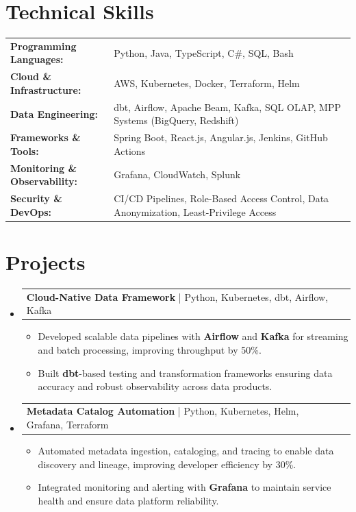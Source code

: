 \documentclass[letterpaper,10pt]{article}
\makeatletter
\newcommand{\resumeItem}[1]{
  \item{\fontsize{8pt}{9pt}\selectfont
    #1 \vspace{-3pt}
  }
}
\newcommand{\resumeProjectHeading}[2]{
    \item
    \begin{tabular*}{1.001\textwidth}{l@{\extracolsep{\fill}}r}
      \fontsize{8.5pt}{10pt}#1 & \textbf{\fontsize{8.5pt}{10pt} #2}\\
    \end{tabular*}\vspace{-7pt}
}
\newcommand{\resumeSubHeadingListStart}{\begin{itemize}[leftmargin=0pt, label={}]}
\newcommand{\resumeSubHeadingListEnd}{\end{itemize}}
\newcommand{\resumeItemListStart}{\begin{itemize}[leftmargin=*]}
\newcommand{\resumeItemListEnd}{\end{itemize}\vspace{-5pt}}
\makeatother
\begin{document}
\section{Technical Skills}
        \vspace{-14pt}
        \begin{table}[h]
            \fontsize{8pt}{9pt}\selectfont
            \begin{tabular}{p{0.3\linewidth} p{0.7\linewidth}}
                \textbf{Programming Languages:} & Python, Java, TypeScript, C\#, SQL, Bash \\
                \textbf{Cloud \& Infrastructure:} & AWS, Kubernetes, Docker, Terraform, Helm \\
                \textbf{Data Engineering:} & dbt, Airflow, Apache Beam, Kafka, SQL OLAP, MPP Systems (BigQuery, Redshift) \\
                \textbf{Frameworks \& Tools:} & Spring Boot, React.js, Angular.js, Jenkins, GitHub Actions \\
                \textbf{Monitoring \& Observability:} & Grafana, CloudWatch, Splunk \\
                \textbf{Security \& DevOps:} & CI/CD Pipelines, Role-Based Access Control, Data Anonymization, Least-Privilege Access \\
            \end{tabular}
        \end{table}
 \vspace{-18pt}

\section{Projects}
    \vspace{-5pt}
    \resumeSubHeadingListStart
          \resumeProjectHeading
            {\textbf{Cloud-Native Data Framework} | Python, Kubernetes, dbt, Airflow, Kafka}
            {}
            \resumeItemListStart
                \resumeItem{Developed scalable data pipelines with \textbf{Airflow} and \textbf{Kafka} for streaming and batch processing, improving throughput by 50\%.}
                \resumeItem{Built \textbf{dbt}-based testing and transformation frameworks ensuring data accuracy and robust observability across data products.}
            \resumeItemListEnd
        \vspace{-12pt}
    
        \resumeProjectHeading
            {\textbf{Metadata Catalog Automation} | Python, Kubernetes, Helm, Grafana, Terraform}
            {}
        \resumeItemListStart
                \resumeItem{Automated metadata ingestion, cataloging, and tracing to enable data discovery and lineage, improving developer efficiency by 30\%.}
                \resumeItem{Integrated monitoring and alerting with \textbf{Grafana} to maintain service health and ensure data platform reliability.}
        \resumeItemListEnd
    \resumeSubHeadingListEnd
\end{document}
